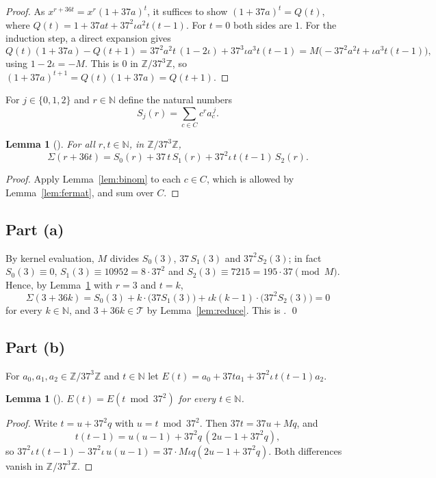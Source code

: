 \documentclass[11pt]{amsart}
\theoremstyle{plain}
\newtheorem{lemma}[theorem]{Lemma}
\theoremstyle{definition}
\newcommand{\N}{\mathbb{N}}
\newcommand{\Z}{\mathbb{Z}}
\newcommand{\Term}{\mathcal{T}}
\newcommand{\Zm}{\Z/37^3\Z}
\begin{document}
\begin{proof}
As $x^{r+36t}=x^r(1+37a)^t$, it suffices to show $(1+37a)^t=Q(t)$, where $Q(t)=1+37at+37^2\iota a^2t(t-1)$. For $t=0$ both sides are $1$. For the induction step, a direct expansion gives
\[
  Q(t)(1+37a)-Q(t+1)=37^2a^2t\,(1-2\iota)+37^3\iota a^3t(t-1)=M\bigl(-37^2a^2t+\iota a^3t(t-1)\bigr),
\]
using $1-2\iota=-M$. This is $0$ in $\Zm$, so $(1+37a)^{t+1}=Q(t)(1+37a)=Q(t+1)$.
\end{proof}

For $j\in\{0,1,2\}$ and $r\in\N$ define the natural numbers
\[
  S_j(r)=\sum_{c\in C}c^r a_c^{\,j}.
\]

\begin{lemma}[]\label{lem:sum}
For all $r,t\in\N$, in $\Zm$,
\[
  \Sigma(r+36t)=S_0(r)+37\,t\,S_1(r)+37^2\iota\,t(t-1)\,S_2(r).
\]
\end{lemma}

\begin{proof}
Apply Lemma~\ref{lem:binom} to each $c\in C$, which is allowed by Lemma~\ref{lem:fermat}, and sum over $C$.
\end{proof}

\subsection{Part (a)}
By kernel evaluation, $M$ divides $S_0(3)$, $37\,S_1(3)$ and $37^2S_2(3)$; in fact $S_0(3)\equiv0$, $S_1(3)\equiv10952=8\cdot37^2$ and $S_2(3)\equiv7215=195\cdot37\pmod M$. Hence, by Lemma~\ref{lem:sum} with $r=3$ and $t=k$,
\[
  \Sigma(3+36k)=S_0(3)+k\cdot\bigl(37S_1(3)\bigr)+\iota k(k-1)\cdot\bigl(37^2S_2(3)\bigr)=0
\]
for every $k\in\N$, and $3+36k\in\Term$ by Lemma~\ref{lem:reduce}. This is . \qed

\subsection{Part (b)}
For $a_0,a_1,a_2\in\Zm$ and $t\in\N$ let $E(t)=a_0+37ta_1+37^2\iota\,t(t-1)a_2$.

\begin{lemma}[]\label{lem:period}
$E(t)=E(t\bmod 37^2)$ for every $t\in\N$.
\end{lemma}

\begin{proof}
Write $t=u+37^2q$ with $u=t\bmod37^2$. Then $37t=37u+Mq$, and
\[
  t(t-1)=u(u-1)+37^2q\,(2u-1+37^2q),
\]
so $37^2\iota\,t(t-1)-37^2\iota\,u(u-1)=37\cdot M\iota q(2u-1+37^2q)$. Both differences vanish in $\Zm$.
\end{proof}
\end{document}
